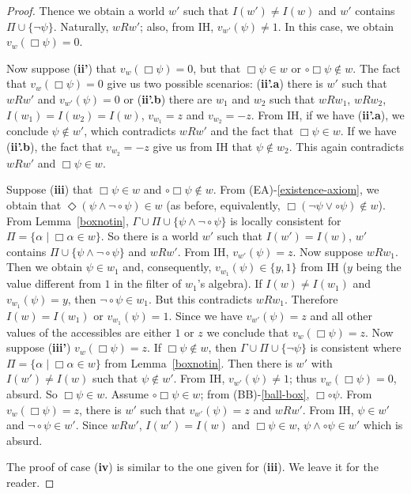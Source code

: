\documentclass{amsart}
\begin{document}
\begin{proof}
    Thence we obtain a world $w'$ such that $I(w') \neq I(w)$ and $w'$ contains $\Pi \cup \{\lnot \psi\}$. Naturally, $w R w'$; also, from IH, $v_{w'}(\psi) \neq 1$. In this case, we obtain $v_w(\Box \psi) = 0$.
    
    Now suppose (\textbf{ii'}) that $v_w(\Box \psi) = 0$, but that $\Box \psi \in w$ or $\circ \Box \psi \notin w$. The fact that $v_w(\Box \psi) = 0$ give us two possible scenarios: (\textbf{ii'.a}) there is $w'$ such that $w R w'$ and $v_{w'}(\psi) = 0$ or (\textbf{ii'.b}) there are $w_1$ and $w_2$ such that $w R w_1$, $w R w_2$, $I(w_1) = I(w_2) = I(w)$, $v_{w_1} = z$ and $v_{w_2} = -z$. From IH, if we have (\textbf{ii'.a}), we conclude $\psi \notin w'$, which contradicts $w R w'$ and the fact that $\Box \psi \in w$. If we have (\textbf{ii'.b}), the fact that $v_{w_2} = -z$ give us from IH that $\psi \notin w_2$. This again contradicts $w R w'$ and $\Box \psi \in w$.

    Suppose (\textbf{iii}) that $\Box \psi \in w$ and $\circ \Box \psi \notin w$. From (EA)-\ref{existence-axiom}, we obtain that $\Diamond (\psi \land \lnot \circ \psi) \in w$ (as before, equivalently, $\Box (\lnot \psi \lor \circ \psi) \notin w$). From Lemma~\ref{boxnotin}, $\Gamma \cup\Pi \cup \{\psi \land \lnot \circ \psi\}$ is locally consistent for $\Pi = \{\alpha \mid \Box \alpha \in w\}$. So there is a world $w'$ such that $I(w') = I(w)$, $w'$ contains $\Pi \cup \{\psi \land \lnot \circ \psi\}$ and $w R w'$. From IH, $v_{w'}(\psi) = z$. Now suppose $w R w_1$. Then we obtain $\psi \in w_1$ and, consequently, $v_{w_1}(\psi) \in \{y, 1\}$ from IH ($y$ being the value different from $1$ in the filter of $w_1$'s algebra). If $I(w) \neq I(w_1)$ and $v_{w_1}(\psi) = y$, then $\lnot \circ \psi \in w_1$. But this contradicts $w R w_1$. Therefore $I(w) = I(w_1)$ or $v_{w_1}(\psi) = 1$. Since we have $v_{w'}(\psi) = z$ and all other values of the accessibles are either $1$ or $z$ we conclude that $v_w(\Box \psi) = z$. Now suppose (\textbf{iii'}) $v_w(\Box \psi) = z$. If $\Box \psi \notin w$, then $\Gamma \cup\Pi \cup \{\lnot \psi\}$ is consistent where $\Pi = \{\alpha \mid \Box \alpha \in w\}$ from Lemma~\ref{boxnotin}. Then there is $w'$ with $I(w') \neq I(w)$ such that $\psi \notin w'$. From IH, $v_{w'}(\psi) \neq 1$; thus $v_w(\Box \psi) = 0$, absurd. So $\Box \psi \in w$. Assume $\circ \Box \psi \in w$; from (BB)-\ref{ball-box}, $\Box \circ \psi$. From $v_w(\Box \psi) = z$, there is $w'$ such that $v_{w'}(\psi) = z$ and $w R w'$. From IH, $\psi \in w'$ and $\lnot \circ \psi \in w'$. Since $w R w'$, $I(w') = I(w)$ and $\Box \psi \in w$, $\psi \land \circ \psi \in w'$ which is absurd. 

    The proof of case (\textbf{iv}) is similar to the one given for (\textbf{iii}).  We leave it for the reader.

\end{proof}
\end{document}
